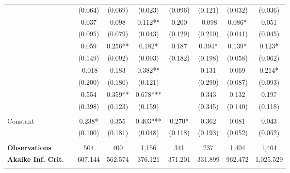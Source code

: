 \begin{tabular*}{\linewidth}{@{\extracolsep{\fill} } llccccccc}
&&(0.064)&(0.069)&(0.023)&(0.096)&(0.121)&(0.032)&(0.036)\\%
\arrayrulecolor{white}%
\hline%
\arrayrulecolor{white}%
\hline%
\arrayrulecolor{white}%
\hline%
\arrayrulecolor{white}%
\hline%
\arrayrulecolor{white}%
\hline%
\multirow{2}{*}{\hspace{0.2cm}100{-}199}&&0.037&0.098&0.112**&0.200&{-}0.098&0.086*&0.051\\%
&&(0.095)&(0.079)&(0.043)&(0.129)&(0.210)&(0.041)&(0.045)\\%
\arrayrulecolor{white}%
\hline%
\arrayrulecolor{white}%
\hline%
\arrayrulecolor{white}%
\hline%
\arrayrulecolor{white}%
\hline%
\arrayrulecolor{white}%
\hline%
\multirow{2}{*}{\hspace{0.2cm}200{-}299}&&0.059&0.256**&0.182*&0.187&0.394*&0.139*&0.123*\\%
&&(0.149)&(0.092)&(0.093)&(0.182)&(0.198)&(0.058)&(0.062)\\%
\arrayrulecolor{white}%
\hline%
\arrayrulecolor{white}%
\hline%
\arrayrulecolor{white}%
\hline%
\arrayrulecolor{white}%
\hline%
\arrayrulecolor{white}%
\hline%
\multirow{2}{*}{\hspace{0.2cm}300{-}399}&&{-}0.018&0.183&0.382**&&0.131&0.069&0.214*\\%
&&(0.200)&(0.180)&(0.121)&&(0.290)&(0.087)&(0.093)\\%
\arrayrulecolor{white}%
\hline%
\arrayrulecolor{white}%
\hline%
\arrayrulecolor{white}%
\hline%
\arrayrulecolor{white}%
\hline%
\arrayrulecolor{white}%
\hline%
\multirow{2}{*}{\hspace{0.2cm}400+}&&0.554&0.359**&0.678***&&0.343&0.132&0.197\\%
&&(0.398)&(0.123)&(0.159)&&(0.345)&(0.140)&(0.118)\\%
\arrayrulecolor{white}%
\hline%
\arrayrulecolor{white}%
\hline%
\arrayrulecolor{white}%
\hline%
\arrayrulecolor{white}%
\hline%
\arrayrulecolor{white}%
\hline%
&&&&&&&&\\%
\multirow{2}{*}{Constant}&&0.238*&0.355&0.403***&0.270*&0.362&0.081&0.043\\%
&&(0.100)&(0.181)&(0.048)&(0.118)&(0.193)&(0.052)&(0.052)\\%
\arrayrulecolor{white}%
\hline%
\arrayrulecolor{white}%
\hline%
\arrayrulecolor{white}%
\hline%
\arrayrulecolor{white}%
\hline%
\arrayrulecolor{white}%
\hline%
&&&&&&&&\\%
\bfseries Observations&&504&400&1,156&341&237&1,404&1,404\\%
\bfseries Akaike Inf. Crit.&&607.144&562.574&376.121&371.201&331.899&962.472&1,025.529\\%
\arrayrulecolor{white}%
\hline%
\arrayrulecolor{white}%
\hline%
\arrayrulecolor{white}%
\hline%
\arrayrulecolor{white}%
\hline%
\arrayrulecolor{white}%
\hline%
\arrayrulecolor{black}%
\hline%
\end{tabular*}